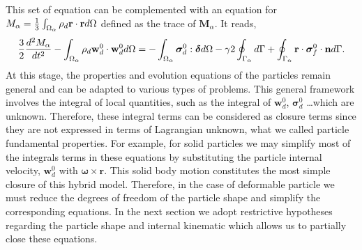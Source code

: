 This set of equation can be complemented with an equation for $M_\alpha = \frac{1}{3}\int_{\Omega_{\alpha}} \rho_d \textbf{r}\cdot \textbf{r} d\Omega$ defined as the trace of $\textbf{M}_\alpha$. 
It reads, 
\begin{equation}
    \frac{3}{2}\frac{d^2 M_\alpha}{dt^2}
    - \int_{\Omega_{\alpha}}  \rho_d \textbf{w}_d^0 \cdot \textbf{w}_d^0 d\Omega
    = 
    - \int_{\Omega_{\alpha}} \bm\sigma_d^0:\bm\delta d\Omega 
    - \gamma 2 \oint_{\Gamma_{\alpha}}  d\Gamma
    + \oint_{\Gamma_{\alpha}} \textbf{r}\cdot\bm\sigma_f^0\cdot \textbf{n} d\Gamma.
    \label{eq:dt_D_alpha}
\end{equation}
At this stage, the properties and evolution equations of the particles remain general and can be adapted to various types of problems. 
This general framework involves the integral of local quantities, such as the integral of $\textbf{w}_d^0$, $\bm\sigma_d^0$ \ldots which are unknown. 
Therefore, these integral terms can be considered as closure terms since they are not expressed in terms of Lagrangian unknown, what we called particle fundamental properties. 
For example, for solid particles we may simplify most of the integrals terms in these equations by substituting the particle internal velocity, $\textbf{w}_d^0$ with $ \bm\omega \times \textbf{r}$. 
This solid body motion constitutes the most simple closure of this hybrid model.  
Therefore, in the case of deformable particle we must reduce the degrees of freedom of the particle shape and simplify the corresponding equations.
In the next section we adopt restrictive hypotheses regarding the particle shape and internal kinematic which allows us to partially close these equations. 